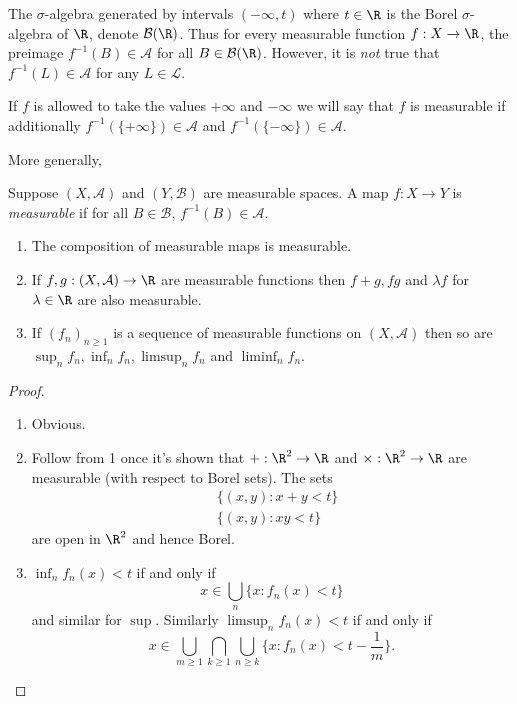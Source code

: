 \documentclass[a4paper]{article}
\begin{document}
\begin{remark}
  The \(\sigma\)-algebra generated by intervals \((-\infty, t)\) where \(t \in \R\) is the Borel \(\sigma\)-algebra of \(\R\), denote \(\mathcal B(\R)\). Thus for every measurable function \(f: X \to \R\), the preimage \(f^{-1}(B) \in \mathcal A\) for all \(B \in \mathcal B(\R)\). However, it is \emph{not} true that \(f^{-1}(L) \in \mathcal A\) for any \(L \in \mathcal L\).
\end{remark}

\begin{remark}
  If \(f\) is allowed to take the values \(+\infty\) and \(-\infty\) we will say that \(f\) is measurable if additionally \(f^{-1}(\{+\infty\}) \in \mathcal A\) and \(f^{-1}(\{-\infty\}) \in \mathcal A\).
\end{remark}

More generally,

\begin{definition}
  Suppose \((X, \mathcal A)\) and \((Y, \mathcal B)\) are measurable spaces. A map \(f: X \to Y\) is \emph{measurable} if for all \(B \in \mathcal B\), \(f^{-1}(B) \in \mathcal A\).
\end{definition}

\begin{proposition}\leavevmode
  \begin{enumerate}
  \item The composition of measurable maps is measurable.
  \item If \(f, g: (X, \mathcal A) \to \R\) are measurable functions then \(f + g, fg\) and \(\lambda f\) for \(\lambda \in \R\) are also measurable.
  \item If \((f_n)_{n \geq 1}\) is a sequence of measurable functions on \((X, \mathcal A)\) then so are \(\sup_n f_n, \inf_n f_n, \limsup_n f_n\) and \(\liminf_n f_n\).
  \end{enumerate}
\end{proposition}

\begin{proof}\leavevmode
  \begin{enumerate}
  \item Obvious.
  \item Follow from 1 once it's shown that \(+: \R^2 \to \R\) and \(\times: \R^2 \to \R\) are measurable (with respect to Borel sets). The sets
    \begin{align*}
      &\{(x, y): x + y < t\} \\
      &\{(x, y): xy < t\}
    \end{align*}
    are open in \(\R^2\) and hence Borel.
  \item \(\inf_n f_n(x) < t\) if and only if
    \[
      x \in \bigcup_n \{x: f_n(x) < t\}
    \]
    and similar for \(\sup\). Similarly \(\limsup_n f_n(x) < t\) if and only if
    \[
      x \in \bigcup_{m \geq 1} \bigcap_{k \geq 1} \bigcup_{n \geq k} \{x: f_n(x) < t - \frac{1}{m}\}.
    \]
  \end{enumerate}
\end{proof}
\end{document}
